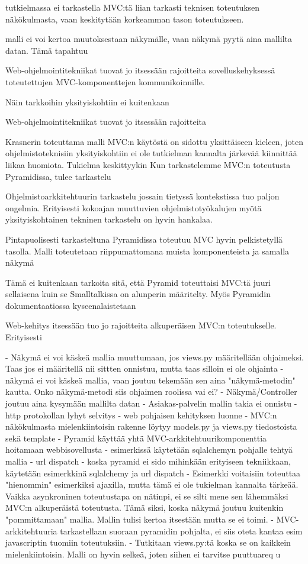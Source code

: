 \documentclass[finnish,utf8,nonumbib,palatino,kandi]{gradu2}
\begin{document}
tutkielmassa ei tarkastella MVC:tä liian tarkasti teknisen toteutuksen näkökulmasta, vaan keskitytään korkeamman tason toteutukseen. 

malli ei voi kertoa muutoksestaan näkymälle, vaan näkymä pyytä aina mallilta datan. Tämä tapahtuu


 Web-ohjelmointitekniikat tuovat jo itsessään rajoitteita 
sovelluskehyksessä toteutettujen MVC-komponenttejen kommunikoinnille. 
 

Näin tarkkoihin yksityiskohtiin ei kuitenkaan 

 Web-ohjelmointitekniikat tuovat jo itsessään rajoitteita 


 Krasnerin toteuttama malli MVC:n käytöstä on sidottu yksittäiseen kieleen, joten ohjelmistoteknisiin yksityiskohtiin ei ole tutkielman kannalta järkevää kiinnittää liikaa huomiota.
Tukielma keskittyykin
 Kun tarkastelemme MVC:n toteutusta Pyramidissa, tulee tarkastelu

 Ohjelmistoarkkitehtuurin tarkastelu jossain tietyssä kontekstissa tuo paljon ongelmia. Erityisesti kokoajan muuttuvien ohjelmistotyökalujen myötä yksityiskohtainen
tekninen tarkastelu on hyvin hankalaa. 

 Pintapuolisesti tarkasteltuna Pyramidissa toteutuu MVC hyvin pelkistetyllä tasolla. 
 Malli toteutetaan riippumattomana muista komponenteista ja samalla näkymä

Tämä ei kuitenkaan tarkoita sitä, että Pyramid toteuttaisi MVC:tä juuri sellaisena kuin se Smalltalkissa on alunperin määritelty. Myös
Pyramidin dokumentaatiossa kyseenalaistetaan 




 Web-kehitys
itsessään tuo jo rajoitteita alkuperäisen MVC:n toteutukselle. Erityisesti 

- Näkymä ei voi käskeä mallia muuttumaan, jos views.py määritellään ohjaimeksi. Taas jos ei määritellä nii sittten onnistuu, mutta taas silloin ei ole ohjainta
- näkymä ei voi käskeä mallia, vaan joutuu tekemään sen aina "näkymä-metodin" kautta. Onko näkymä-metodi siis ohjaimen roolissa vai ei?
- Näkymä/Controller joutuu aina kysymään mallilta datan
- Asiakas-palvelin mallin takia ei onnistu
- http protokollan lyhyt selvitys
- web pohjaisen kehityksen luonne
- MVC:n näkökulmasta mielenkiintoisin rakenne löytyy models.py ja views.py tiedostoista sekä template
- Pyramid käyttää yhtä MVC-arkkitehtuurikomponenttia hoitamaan webbisovellusta
- esimerkissä käytetään sqlalchemyn pohjalle tehtyä mallia
- url dispatch
- koska pyramid ei sido mihinkään erityiseen tekniikkaan, käytetään esimerkkinä sqlalchemy ja url dispatch
- Esimerkki voitaisiin toteuttaa "hienommin" esimerkiksi ajaxilla, mutta tämä ei ole tukielman kannalta tärkeää. Vaikka
asynkroninen toteutustapa on nätinpi, ei se silti mene sen lähemmäksi MVC:n alkuperäistä toteutusta. Tämä siksi,
koska näkymä joutuu kuitenkin "pommittamaan" mallia. Mallin tulisi kertoa itsestään mutta se ei toimi.
- MVC-arkkitehtuuria tarkastellaan suoraan pyramidin pohjalta, ei siis oteta kantaa esim javascriptin tuomiin 
toteutuksiin.
- Tutkitaan views.py:tä koska se on kaikkein mielenkiintoisin. Malli on hyvin selkeä, joten siihen ei tarvitse puuttuareq	u
\end{document}
